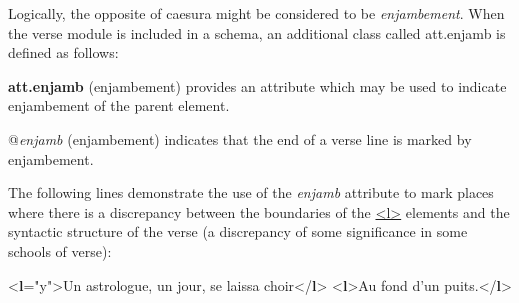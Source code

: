 Logically, the opposite of caesura might be considered to be \textit{enjambement}. When the \textsf{verse} module is included in a schema, an additional class called \textsf{att.enjamb} is defined as follows: 
\begin{sansreflist}
  
\item [\textbf{att.enjamb}] (enjambement) provides an attribute which may be used to indicate enjambement of the parent element.\hfil\\[-10pt]\begin{sansreflist}
    \item[@{\itshape enjamb}]
  (enjambement) indicates that the end of a verse line is marked by enjambement.
\end{sansreflist}  
\end{sansreflist}
 The following lines demonstrate the use of the {\itshape enjamb} attribute to mark places where there is a discrepancy between the boundaries of the \hyperref[TEI.l]{<l>} elements and the syntactic structure of the verse (a discrepancy of some significance in some schools of verse): \par\bgroup{}\exampleFont \begin{shaded}\noindent\mbox{}{<\textbf{l}\hspace*{1em}{enjamb}="{y}">}Un astrologue, un jour, se laissa choir{</\textbf{l}>}\mbox{}\newline 
{<\textbf{l}>}Au fond d'un puits.{</\textbf{l}>}\end{shaded}\egroup\par \noindent       
